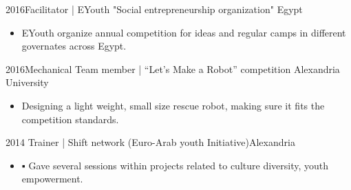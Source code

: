 \begin{extras}

  \extra
    {2016}{Facilitator |  EYouth "Social entrepreneurship organization" }{Egypt}
      {
                      \begin{itemize}
                         \item EYouth organize annual competition for ideas and regular camps in different governates across Egypt.
                      \end{itemize}
                    }
  \emptySeparator
  \extra
    {2016}{Mechanical Team member | “Let’s Make a Robot” competition }{Alexandria University}
      {
                      \begin{itemize}
                         \item Designing a light weight, small size  rescue robot, making sure it fits the competition standards.
                      \end{itemize}
                    }
  \emptySeparator
    \extra
    {2014} {Trainer | Shift network (Euro-Arab youth Initiative)}{Alexandria}
           {
                      \begin{itemize}
                        \item ▪	Gave several sessions within projects related to culture diversity, youth empowerment.
                      \end{itemize}
                    }
  \emptySeparator
\end{extras}
